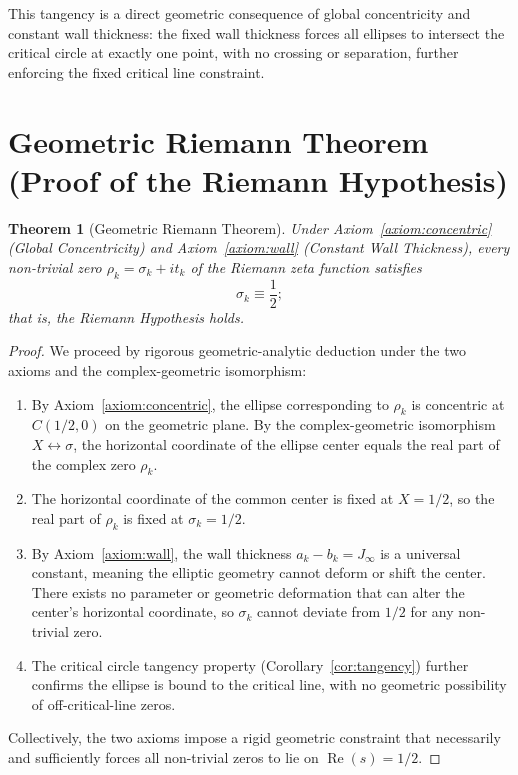 \documentclass[12pt,a4paper]{article}
\newtheorem{theorem}{Theorem}
\theoremstyle{definition}
\begin{document}
This tangency is a direct geometric consequence of global concentricity and constant wall thickness: the fixed wall thickness forces all ellipses to intersect the critical circle at exactly one point, with no crossing or separation, further enforcing the fixed critical line constraint.

\section{Geometric Riemann Theorem (Proof of the Riemann Hypothesis)}
\label{sec:theorem}

\begin{theorem}[Geometric Riemann Theorem]
\label{thm:geometric_rh}
Under Axiom~\ref{axiom:concentric} (Global Concentricity) and Axiom~\ref{axiom:wall} (Constant Wall Thickness), every non-trivial zero $\rho_k = \sigma_k + i t_k$ of the Riemann zeta function satisfies
\[
\boxed{\sigma_k \equiv \frac{1}{2};}
\]
that is, the Riemann Hypothesis holds.
\end{theorem}

\begin{proof}
We proceed by rigorous geometric-analytic deduction under the two axioms and the complex-geometric isomorphism:

\begin{enumerate}
\item By Axiom~\ref{axiom:concentric}, the ellipse corresponding to $\rho_k$ is concentric at $C(1/2, 0)$ on the geometric plane. By the complex-geometric isomorphism $X \leftrightarrow \sigma$, the horizontal coordinate of the ellipse center equals the real part of the complex zero $\rho_k$.
\item The horizontal coordinate of the common center is fixed at $X = 1/2$, so the real part of $\rho_k$ is fixed at $\sigma_k = 1/2$.
\item By Axiom~\ref{axiom:wall}, the wall thickness $a_k - b_k = J_\infty$ is a universal constant, meaning the elliptic geometry cannot deform or shift the center. There exists no parameter or geometric deformation that can alter the center's horizontal coordinate, so $\sigma_k$ cannot deviate from $1/2$ for any non-trivial zero.
\item The critical circle tangency property (Corollary~\ref{cor:tangency}) further confirms the ellipse is bound to the critical line, with no geometric possibility of off-critical-line zeros.
\end{enumerate}

Collectively, the two axioms impose a rigid geometric constraint that necessarily and sufficiently forces all non-trivial zeros to lie on $\operatorname{Re}(s) = 1/2$.
\end{proof}
\end{document}
